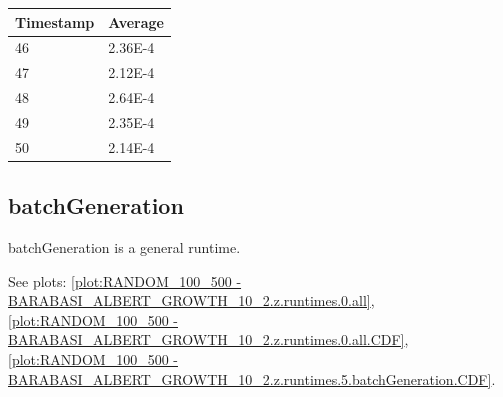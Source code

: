 \begin{tabular}{|l||l|}
\hline
	\textbf{Timestamp} & \textbf{Average} \\ \hline
	46 & 2.36E-4 \\ \hline
	47 & 2.12E-4 \\ \hline
	48 & 2.64E-4 \\ \hline
	49 & 2.35E-4 \\ \hline
	50 & 2.14E-4 \\ \hline
\end{tabular}

\subsection{batchGeneration}
batchGeneration is a general runtime.

See plots: \ref{plot:RANDOM_100_500 - BARABASI_ALBERT_GROWTH_10_2.z.runtimes.0.all}, \ref{plot:RANDOM_100_500 - BARABASI_ALBERT_GROWTH_10_2.z.runtimes.0.all.CDF}, \ref{plot:RANDOM_100_500 - BARABASI_ALBERT_GROWTH_10_2.z.runtimes.5.batchGeneration.CDF}.

